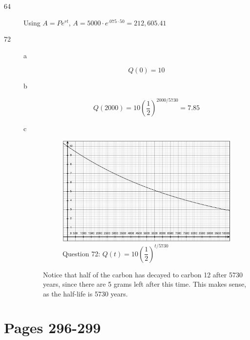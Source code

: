 \documentclass[fleqn,addpoints]{exam}
\begin{document}
\begin{description}
\item[64]

Using $A=Pe^{rt}$, $A = 5000 \cdot e^{.075 \cdot 50} = 212,605.41$

\item[72]

\begin{description}

\item[a]
\[
Q(0) = 10
\]

\item[b]
\[
  Q(2000) = 10 \left( \frac{1}{2} \right)^{2000/5730} = 7.85
\]

\item[c]
\begin{figure}[H]
  \centering
  \includegraphics[scale=.3]{question72.eps}
  \caption*{Question 72: $Q(t) = 10 \left( \dfrac{1}{2} \right)^{t/5730}$}
\end{figure}

Notice that half of the carbon has decayed to carbon 12 after 5730 years, since there are 5 grams left after this time.
This makes sense, as the half-life is 5730 years.
 
\end{description}

\end{description}

\section{Pages 296-299}
\end{document}
